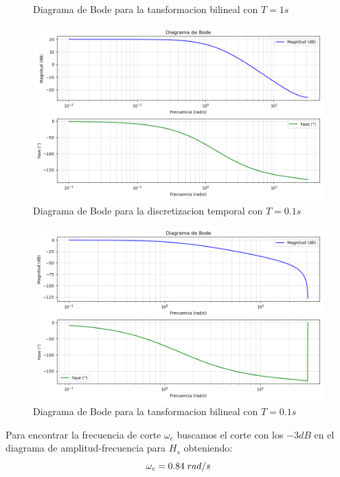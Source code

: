 \documentclass[a4paper,12pt]{report}
\begin{document}
\begin{enumerate}[label=\alph*), left=0pt]
\begin{figure}[H]
                \caption{Diagrama de Bode para la tansformacion bilineal con $T=1s$}
              \end{figure}
              \begin{figure}[H]
                \centering
                \includegraphics[width=1\linewidth]{./images/BodeD2.png}
                \caption{Diagrama de Bode para la discretizacion temporal con $T=0.1s$}
              \end{figure}
              \begin{figure}[H]
                \centering
                \includegraphics[width=1\linewidth]{./images/BodeB2.png}
                \caption{Diagrama de Bode para la tansformacion bilineal con $T=0.1s$}
              \end{figure}

              Para encontrar la frecuencia de corte $\omega_c$ buscamos el corte con los $-3dB$
              en el diagrama de amplitud-frecuencia para $H_s$ obteniendo:
              $$\omega_c=0.84 \hspace{1mm} rad/s$$



\end{enumerate}
\end{document}
